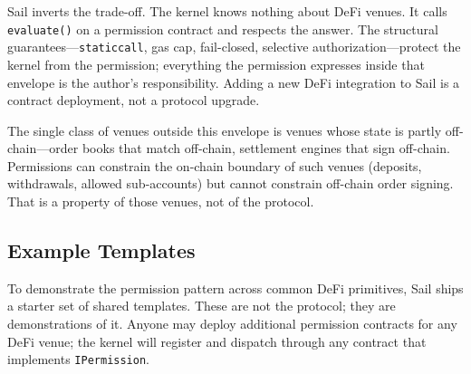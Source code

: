 \documentclass[11pt]{article}
\begin{document}
Sail inverts the trade-off. The kernel knows nothing about DeFi venues. It calls \texttt{evaluate()} on a permission contract and respects the answer. The structural guarantees---\texttt{staticcall}, gas cap, fail-closed, selective authorization---protect the kernel from the permission; everything the permission expresses inside that envelope is the author's responsibility. Adding a new DeFi integration to Sail is a contract deployment, not a protocol upgrade.

The single class of venues outside this envelope is venues whose state is partly off-chain---order books that match off-chain, settlement engines that sign off-chain. Permissions can constrain the on-chain boundary of such venues (deposits, withdrawals, allowed sub-accounts) but cannot constrain off-chain order signing. That is a property of those venues, not of the protocol.

\subsection{Example Templates}
\label{sec:templates}

To demonstrate the permission pattern across common DeFi primitives, Sail ships a starter set of shared templates. These are not the protocol; they are demonstrations of it. Anyone may deploy additional permission contracts for any DeFi venue; the kernel will register and dispatch through any contract that implements \texttt{IPermission}.
\end{document}
